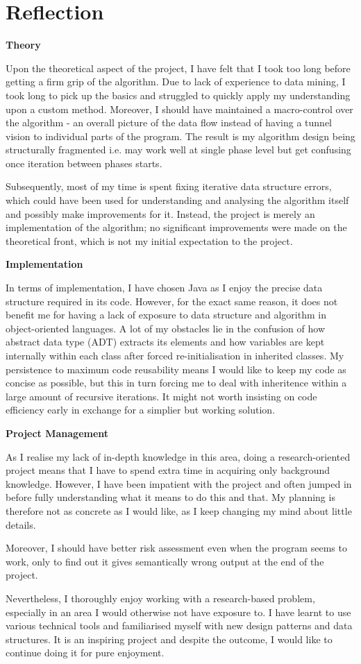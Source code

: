 \chapter{Reflection}

\textbf{Theory}
	
Upon the theoretical aspect of the project, I have felt that I took too long before getting a firm grip of the algorithm. Due to lack of experience to data mining, I took long to pick up the basics and struggled to quickly apply my understanding upon a custom method. Moreover, I should have maintained a macro-control over the algorithm - an overall picture of the data flow instead of having a tunnel vision to individual parts of the program. The result is my algorithm design being structurally fragmented i.e. may work well at single phase level but get confusing once iteration between phases starts.

Subsequently, most of my time is spent fixing iterative data structure errors, which could have been used for understanding and analysing the algorithm itself and possibly make improvements for it. Instead, the project is merely an implementation of the algorithm; no significant improvements were made on the theoretical front, which is not my initial expectation to the project. 

\bigskip
\textbf{Implementation}

In terms of implementation, I have chosen Java as I enjoy the precise data structure required in its code. However, for the exact same reason, it does not benefit me for having a lack of exposure to data structure and algorithm in object-oriented languages. A lot of my obstacles lie in the confusion of how abstract data type (ADT) extracts its elements and how variables are kept internally within each class after forced re-initialisation in inherited classes. My persistence to maximum code reusability means I would like to keep my code as concise as possible, but this in turn forcing me to deal with inheritence within a large amount of recursive iterations. It might not worth insisting on code efficiency early in exchange for a simplier but working solution. 

\bigskip
\textbf{Project Management}

As I realise my lack of in-depth knowledge in this area, doing a research-oriented project means that I have to spend extra time in acquiring only background knowledge. However, I have been impatient with the project and often jumped in before fully understanding what it means to do this and that. My planning is therefore not as concrete as I would like, as I keep changing my mind about little details.

Moreover, I should have better risk assessment even when the program seems to work, only to find out it gives semantically wrong output at the end of the project. 

\bigskip
Nevertheless, I thoroughly enjoy working with a research-based problem, especially in an area I would otherwise not have exposure to. I have learnt to use various technical tools and familiarised myself with new design patterns and data structures. It is an inspiring project and despite the outcome, I would like to continue doing it for pure enjoyment. 


